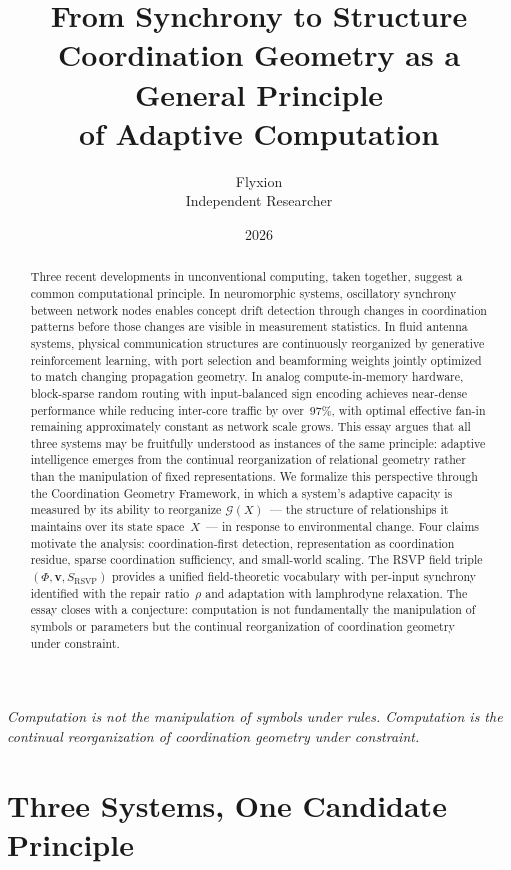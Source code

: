\documentclass[11pt, a4paper]{article}
\title{\textbf{From Synchrony to Structure}\\
{\large Coordination Geometry as a General Principle\\
of Adaptive Computation}}
\author{Flyxion \\ \small Independent Researcher}
\date{2026}
\theoremstyle{definition}
\theoremstyle{remark}
\begin{document}
\maketitle

\begin{abstract}
Three recent developments in unconventional computing, taken together,
suggest a common computational principle. In neuromorphic systems,
oscillatory synchrony between network nodes enables concept drift detection
through changes in coordination patterns before those changes are visible
in measurement statistics. In fluid antenna systems, physical communication
structures are continuously reorganized by generative reinforcement learning,
with port selection and beamforming weights jointly optimized to match
changing propagation geometry. In analog compute-in-memory hardware,
block-sparse random routing with input-balanced sign encoding achieves
near-dense performance while reducing inter-core traffic by over~97\%,
with optimal effective fan-in remaining approximately constant as network
scale grows. This essay argues that all three systems may be fruitfully
understood as instances of the same principle: adaptive intelligence
emerges from the continual reorganization of relational geometry rather
than the manipulation of fixed representations. We formalize this perspective
through the Coordination Geometry Framework, in which a system's adaptive
capacity is measured by its ability to reorganize $\mathcal{G}(X)$~--- the
structure of relationships it maintains over its state space~$X$~--- in
response to environmental change. Four claims motivate the analysis:
coordination-first detection, representation as coordination residue,
sparse coordination sufficiency, and small-world scaling. The RSVP field
triple $(\Phi, \mathbf{v}, S_{\mathrm{RSVP}})$ provides a unified
field-theoretic vocabulary with per-input synchrony identified with the
repair ratio~$\rho$ and adaptation with lamphrodyne relaxation. The essay
closes with a conjecture: computation is not fundamentally the manipulation
of symbols or parameters but the continual reorganization of coordination
geometry under constraint.
\end{abstract}

\newpage

\epigraph{\textit{Computation is not the manipulation of symbols under rules.
Computation is the continual reorganization of coordination geometry under
constraint.}}{}

\section{Three Systems, One Candidate Principle}
\end{document}
